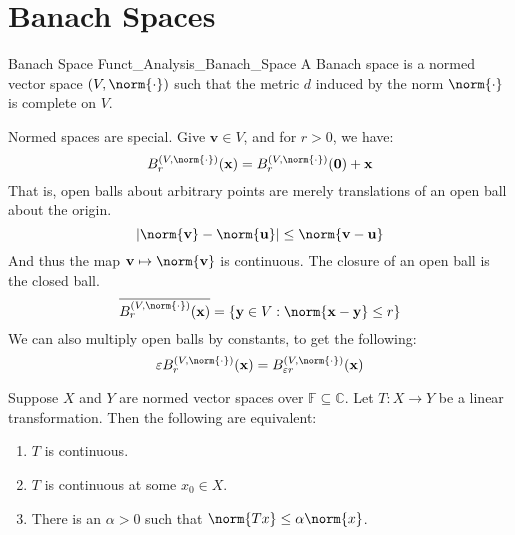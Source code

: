     \section{Banach Spaces}
    \begin{ldefinition}{Banach Space}
          {Funct_Analysis_Banach_Space}
        A Banach space is a normed vector space
        $(V,\norm{\cdot})$ such that the metric $d$ induced by
        the norm $\norm{\cdot}$ is complete on $V$.
    \end{ldefinition}
    Normed spaces are special. Give $\mathbf{v}\in{V}$, and
    for $r>0$, we have:
    \begin{equation}
        B_{r}^{(V,\norm{\cdot})}(\mathbf{x})=
        B_{r}^{(V,\norm{\cdot})}(\mathbf{0})+\mathbf{x}
    \end{equation}
    That is, open balls about arbitrary points are merely
    translations of an open ball about the origin.
    \begin{equation}
        |\norm{\mathbf{v}}-\norm{\mathbf{u}}|
        \leq\norm{\mathbf{v}-\mathbf{u}}
    \end{equation}
    And thus the map $\mathbf{v}\mapsto\norm{\mathbf{v}}$ is
    continuous. The closure of an open ball is the closed ball.
    \begin{equation}
        \overline{B_{r}^{(V,\norm{\cdot})}(\mathbf{x})}
        =\{\mathbf{y}\in{V}:
            \norm{\mathbf{x}-\mathbf{y}}\leq{r}\}
    \end{equation}
    We can also multiply open balls by constants, to get
    the following:
    \begin{equation}
        \varepsilon{B}_{r}^{(V,\norm{\cdot})}(\mathbf{x})=
        B_{\varepsilon{r}}^{(V,\norm{\cdot})}(\mathbf{x})
    \end{equation}
    \begin{theorem}
        Suppose $X$ and $Y$ are normed vector spaces over
        $\mathbb{F}\subseteq\mathbb{C}$. Let $T:X\rightarrow{Y}$
        be a linear transformation. Then the following
        are equivalent:
        \begin{enumerate}
            \item $T$ is continuous.
            \item $T$ is continuous at some $x_{0}\in{X}$.
            \item There is an $\alpha>0$ such that
                  $\norm{Tx}\leq\alpha\norm{x}$.
        \end{enumerate}
    \end{theorem}
